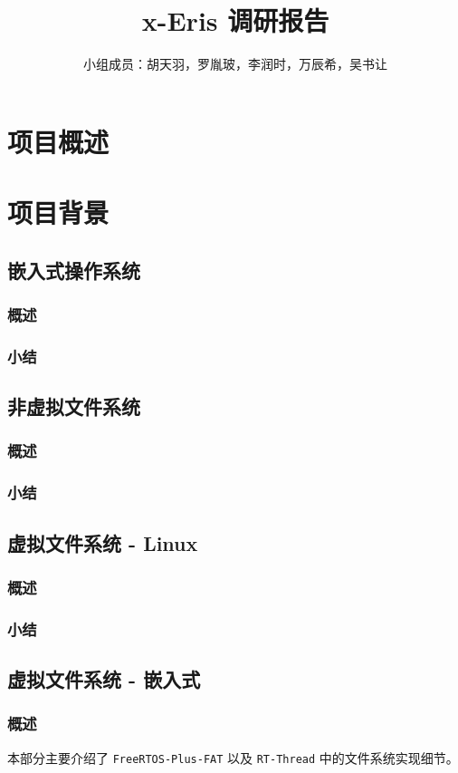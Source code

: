 \documentclass[a4paper]{article}
\title{x-Eris 调研报告}
\author{小组成员：胡天羽，罗胤玻，李润时，万辰希，吴书让}
\begin{document}
\maketitle

\section{项目概述}
\section{项目背景}
\subsection{嵌入式操作系统}
\subsubsection{概述}
\subsubsection{小结}

\subsection{非虚拟文件系统}
\subsubsection{概述}
\subsubsection{小结}

\subsection{虚拟文件系统 - Linux}
\subsubsection{概述}
\subsubsection{小结}

\subsection{虚拟文件系统 - 嵌入式}
\subsubsection{概述}
本部分主要介绍了 \texttt{FreeRTOS-Plus-FAT} 以及 \texttt{RT-Thread} 中的文件系统实现细节。
\end{document}
